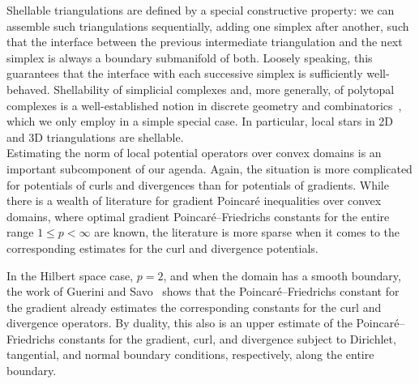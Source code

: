 \documentclass[10pt,letterpaper]{article}
\begin{document}
Shellable triangulations are defined by a special constructive property:
we can assemble such triangulations sequentially, adding one simplex after another, such that the interface between the previous intermediate triangulation and the next simplex is always a boundary submanifold of both.
Loosely speaking, this guarantees that the interface with each successive simplex is sufficiently well-behaved.
Shellability of simplicial complexes and, more generally, of polytopal complexes is a well-established notion in discrete geometry and combinatorics~\cite{ziegler2012lectures}, which we only employ in a simple special case. 
In particular, local stars in 2D and 3D triangulations are shellable. 
\\



Estimating the norm of local potential operators over convex domains is an important subcomponent of our agenda. 
Again, the situation is more complicated for potentials of curls and divergences than for potentials of gradients.
While there is a wealth of literature for gradient Poincar\'e inequalities over convex domains, where optimal gradient Poincar\'e--Friedrichs constants for the entire range $1 \leq p < \infty$ are known,
the literature is more sparse when it comes to the corresponding estimates for the curl and divergence potentials.

In the Hilbert space case, $p=2$, and when the domain has a smooth boundary, the work of Guerini and Savo~\cite{guerini2004eigenvalue} shows that the Poincar\'e--Friedrichs constant for the gradient already estimates the corresponding constants for the curl and divergence operators. By duality, this also is an upper estimate of the Poincar\'e--Friedrichs constants for the gradient, curl, and divergence subject to Dirichlet, tangential, and normal boundary conditions, respectively, along the entire boundary. 
\end{document}
